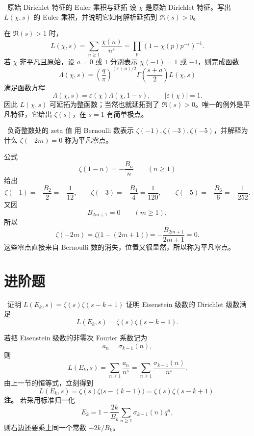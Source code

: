 \begin{problem}{\easy\ 原始 Dirichlet 特征的 Euler 乘积与延拓}
设 $\chi$ 是原始 Dirichlet 特征。写出 $L(\chi,s)$ 的 Euler 乘积，并说明它如何解析延拓到 $\Re(s)>0$。
\end{problem}
\begin{solution}
在 $\Re(s)>1$ 时，
\[
L(\chi,s)=\sum_{n\ge1}\frac{\chi(n)}{n^s}
=\prod_p\left(1-\chi(p)p^{-s}\right)^{-1}.
\]
若 $\chi$ 非平凡且原始，设 $a=0$ 或 $1$ 分别表示 $\chi(-1)=1$ 或 $-1$，则完成函数
\[
\Lambda(\chi,s)=\left(\frac{q}{\pi}\right)^{(s+a)/2}\Gamma\!\left(\frac{s+a}{2}\right)L(\chi,s)
\]
满足函数方程
\[
\Lambda(\chi,s)=\varepsilon(\chi)\Lambda(\overline{\chi},1-s),
\qquad |\varepsilon(\chi)|=1.
\]
因此 $L(\chi,s)$ 可延拓为整函数；当然也就延拓到了 $\Re(s)>0$。唯一的例外是平凡特征，它给出 $\zeta(s)$，在 $s=1$ 有简单极点。
\end{solution}

\begin{problem}{\easy\ 负奇整数处的 zeta 值}
用 Bernoulli 数表示 $\zeta(-1),\zeta(-3),\zeta(-5)$，并解释为什么 $\zeta(-2m)=0$ 称为平凡零点。
\end{problem}
\begin{solution}
公式
\[
\zeta(1-n)=-\frac{B_n}{n}\qquad (n\ge1)
\]
给出
\[
\zeta(-1)=-\frac{B_2}{2}=-\frac1{12},
\qquad
\zeta(-3)=-\frac{B_4}{4}=\frac1{120},
\qquad
\zeta(-5)=-\frac{B_6}{6}=-\frac1{252}.
\]
又因
\[
B_{2m+1}=0\qquad (m\ge1),
\]
所以
\[
\zeta(-2m)=\zeta\bigl(1-(2m+1)\bigr)=-\frac{B_{2m+1}}{2m+1}=0.
\]
这些零点直接来自 Bernoulli 数的消失，位置又很显然，所以称为平凡零点。
\end{solution}

\section{进阶题 \medium}

\begin{problem}{\medium\ 证明 $L(E_k,s)=\zeta(s)\zeta(s-k+1)$}
证明 Eisenstein 级数的 Dirichlet 级数满足
\[
L(E_k,s)=\zeta(s)\zeta(s-k+1).
\]
\end{problem}
\begin{solution}
若把 Eisenstein 级数的非零次 Fourier 系数记为
\[
a_n=\sigma_{k-1}(n),
\]
则
\[
L(E_k,s)=\sum_{n\ge1}\frac{a_n}{n^s}
=\sum_{n\ge1}\frac{\sigma_{k-1}(n)}{n^s}.
\]
由上一节的恒等式，立刻得到
\[
L(E_k,s)=\zeta(s)\zeta\bigl(s-(k-1)\bigr)=\zeta(s)\zeta(s-k+1).
\]
\textbf{注。} 若采用标准归一化
\[
E_k=1-\frac{2k}{B_k}\sum_{n\ge1}\sigma_{k-1}(n)q^n,
\]
则右边还要乘上同一个常数 $-2k/B_k$。
\end{solution}

